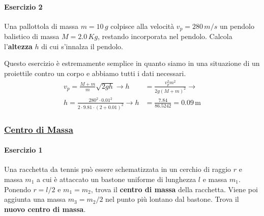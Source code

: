 \paragraph{Esercizio 2}
Una pallottola di massa $m = 10\,g$ colpisce alla velocità $v_p = 280\,m/s$ un pendolo balistico di
massa $M = 2.0\,Kg$, restando incorporata nel pendolo. Calcola l'\textbf{altezza} $h$ di cui s'innalza
il pendolo.
\divisor

Questo esercizio è estremamente semplice in quanto siamo in una situazione di un proiettile contro
un corpo e abbiamo tutti i dati necessari.
\begin{align*}
  v_p = \frac{M+m}{m}\sqrt{2gh} \rightarrow h &= \frac{v_p^2m^2}{2g\left(M+m\right)^2} \rightarrow\\
  h = \frac{280^2\cdot0.01^2}{2\cdot9.81\cdot(2+0.01)^2} \rightarrow h &= \frac{7.84}{86.5242} = 
  \boxed{0.09\,\text{m}}
\end{align*}

\subsubsection*{\hyperref[subsec:dinamica:cm]{Centro di Massa}}\label{ex:cm}
\paragraph{Esercizio 1}
Una racchetta da tennis può essere schematizzata in un cerchio di raggio $r$ e massa $m_1 $ a cui è 
attaccato un bastone uniforme di lunghezza $l$ e massa $m_1$. Ponendo $r = l/2$ e $m_1=m_2$, trova il
\textbf{centro di massa} della racchetta. Viene poi aggiunta una massa $m_3 = m_2/2$ nel punto più
lontano dal bastone. Trova il \textbf{nuovo centro di massa}.

\begin{center}
\end{center}

\divisor


